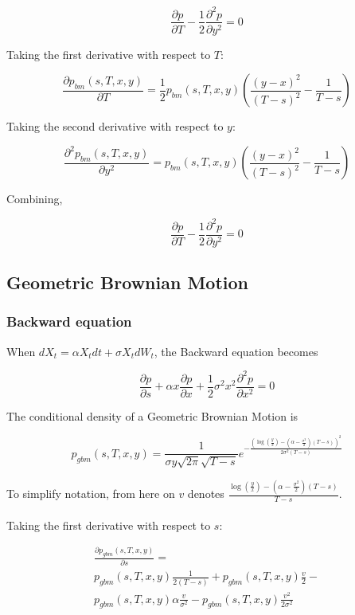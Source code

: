 \documentclass{article}
\theoremstyle{definition}
\begin{document}
\[\frac{\partial p} {\partial T} -\frac{1}{2} \frac{\partial^2 p}{\partial y^2} =0\]

Taking the first derivative with respect to \(T\):

\[\frac{\partial p_{bm}(s, T, x, y)}{\partial T}=  \frac{1}{2}p_{bm}(s, T, x, y)\left(\frac{(y-x)^2}{(T-s)^2}-\frac{1}{T-s}\right)  \]

Taking the second derivative with respect to \(y\):

\[\frac{\partial^2 p_{bm}(s, T, x, y)}{\partial y^2}=  p_{bm}(s, T, x, y)\left(\frac{(y-x)^2}{(T-s)^2}-\frac{1}{T-s}\right)  \]

Combining, 

\[\frac{\partial p} {\partial T} -\frac{1}{2} \frac{\partial^2 p}{\partial y^2} =0\]

\subsection{Geometric Brownian Motion}
\subsubsection{Backward equation}
When \(dX_t=\alpha X_t dt+\sigma X_t dW_t\), the Backward equation becomes

\[\frac{\partial p} {\partial s} +\alpha x \frac{\partial p}{\partial x} + \frac{1}{2} \sigma^2 x^2 \frac{\partial^2 p}{\partial x^2} =0\]

The conditional density of a Geometric Brownian Motion is

\[p_{gbm}(s, T, x, y)=\frac{1}{\sigma y\sqrt{2\pi} \sqrt{T-s} } e^{-\frac{\left( \log\left(\frac{y}{x}\right) -\left(\alpha-\frac{\sigma^2}{2}\right)(T-s)\right)^2}{2\sigma^2(T-s)}} \]

To simplify notation, from here on \(v\) denotes \(\frac{ \log\left(\frac{y}{x}\right) -\left(\alpha-\frac{\sigma^2}{2}\right)(T-s)}{T-s}\).
\\
\\
Taking the first derivative with respect to \(s\):


\begin{multline*}
\frac{\partial p_{gbm}(s, T, x, y)}{\partial s}  = \\ p_{gbm}(s, T, x, y) \frac{1}{2(T-s)} + p_{gbm}(s, T, x, y) \frac{v}{2}   - \\p_{gbm}(s, T, x, y) \alpha\frac{v}{\sigma^2}  -p_{gbm}(s, T, x, y)\frac{v^2}{2\sigma^2}  
\end{multline*}
\end{document}
